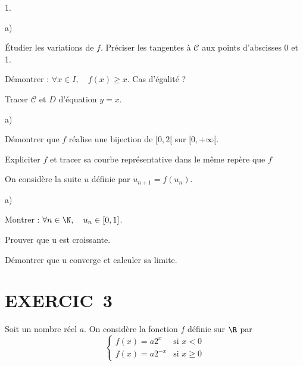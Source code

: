 \documentclass[11pt]{article}%
\begin{document}
\begin{noliste}{1.}
 \setlength{\itemsep}{4mm}
\item 

\begin{noliste}{a)}
 \setlength{\itemsep}{2mm}
\item Étudier les variations de $f$. Préciser les tangentes à
$\mathcal{C}$
aux points d'abscisses 0 et 1.

\item Démontrer : $\forall x\in I,\quad f(x)\geq x.$ Cas d'égalité ?

\item Tracer $\mathcal{C}$ et $D$ d'équation $y = x$.
\end{noliste}

\item 

\begin{noliste}{a)}
 \setlength{\itemsep}{2mm}
\item Démontrer que $f$ réalise une bijection de $[0,2[$ sur $[0, +
\infty
\lbrack $.

\item Expliciter $f$ et tracer sa courbe représentative dans le même
repère
que $f$
\end{noliste}

\item On considère la suite $u$ définie par $u_{n + 1} = f(u_{n})$.

\begin{noliste}{a)}
 \setlength{\itemsep}{2mm}
\item Montrer : $\forall n\in \N,\quad u_{n}\in \lbrack 0,1]$. 

\item Prouver que u est croissante.

\item Démontrer que u converge et calculer sa limite.
\end{noliste}
\end{noliste}

\section*{EXERCIC\E\ 3}

Soit un nombre réel $a$. On considère la fonction $f$ définie sur $\R
$ par
\[
\left\{ 
\begin{array}{cc}
f(x) = a2^{x} & \text{si }x<0 \\
f(x) = a2^{-x} & \text{si }x\geq 0
\end{array}
\right. 
\]
\end{document}
